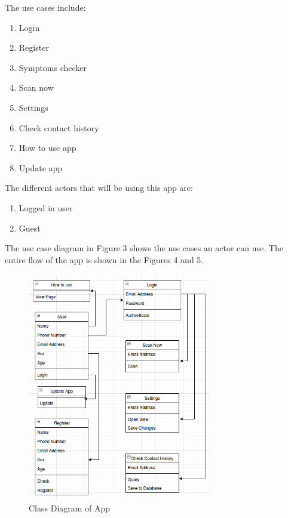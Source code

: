 \documentclass[10pt,twocolumn,letterpaper]{article}
\begin{document}
The use cases include:
\begin{enumerate}
  \setlength\itemsep{0.2em}
  \item Login
  \item Register
  \item Symptoms checker
  \item Scan now
  \item Settings
  \item Check contact history
  \item How to use app
  \item Update app
\end{enumerate}
\newline
The different actors that will be using this app are:
\begin{enumerate}
  \item Logged in user
  \item Guest
\end{enumerate}
The use case diagram in Figure 3 shows the use cases an actor can use.
\newline\newline
The entire flow of the app is shown in the Figures 4 and 5.

\begin{figure}[h!]
  \centering
  \includegraphics[width=8cm, height=10cm]{UML_Class_App}
  \caption[Caption for LOF]{Class Diagram of App\footnotemark}
\end{figure}
\end{document}
